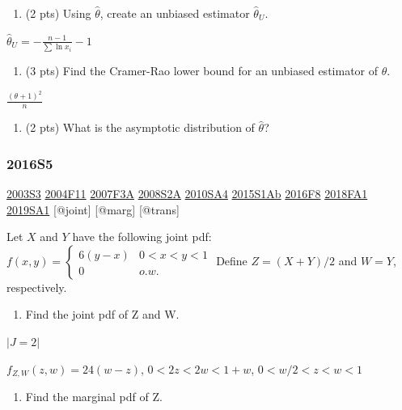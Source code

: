 \documentclass[6pt,Portrait]{article}
\providecommand{\tightlist}{%
  \setlength{\itemsep}{0pt}\setlength{\parskip}{0pt}}
\begin{document}
\begin{enumerate}
\def\labelenumi{(\alph{enumi})}
\setcounter{enumi}{1}
\tightlist
\item
  (2 pts) Using \(\hat\theta\), create an unbiased estimator
  \(\hat\theta_U\).
\end{enumerate}

\(\hat\theta_U=-\frac{n-1}{\sum\ln x_i}-1\)

\begin{enumerate}
\def\labelenumi{(\alph{enumi})}
\setcounter{enumi}{2}
\tightlist
\item
  (3 pts) Find the Cramer-Rao lower bound for an unbiased estimator of
  \(\theta\).
\end{enumerate}

\(\frac{(\theta+1)^2}{n}\)

\begin{enumerate}
\def\labelenumi{(\alph{enumi})}
\setcounter{enumi}{3}
\tightlist
\item
  (2 pts) What is the asymptotic distribution of \(\hat\theta\)?
\end{enumerate}

\hypertarget{s5-4}{%
\subsubsection{2016S5}\label{s5-4}}

\protect\hyperlink{s3}{2003S3} \protect\hyperlink{f11}{2004F11}
\protect\hyperlink{f3a}{2007F3A} \protect\hyperlink{s2a}{2008S2A}
\protect\hyperlink{sa4-1}{2010SA4} \protect\hyperlink{s1ab}{2015S1Ab}
\protect\hyperlink{f8-4}{2016F8} \protect\hyperlink{fa1-4}{2018FA1}
\protect\hyperlink{sa1-3}{2019SA1} {[}@joint{]} {[}@marg{]} {[}@trans{]}

Let \(X\) and \(Y\) have the following joint pdf:
\(f(x,y) =\begin{cases}6(y-x)& 0<x<y<1\\0& o.w.\end{cases}\) Define
\(Z=(X+Y)/2\) and \(W=Y\), respectively.

\begin{enumerate}
\def\labelenumi{(\alph{enumi})}
\tightlist
\item
  Find the joint pdf of Z and W.
\end{enumerate}

\(|J=2|\)

\(f_{Z,W}(z,w)=24(w-z)\), \(0<2z<2w<1+w\), \(0<w/2<z<w<1\)

\begin{enumerate}
\def\labelenumi{(\alph{enumi})}
\setcounter{enumi}{1}
\tightlist
\item
  Find the marginal pdf of Z.
\end{enumerate}
\end{document}
